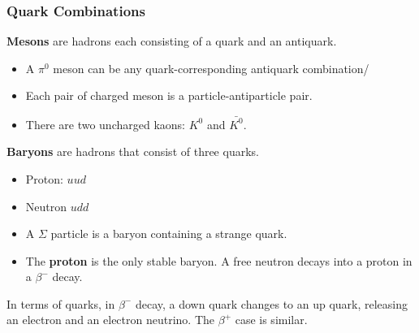 \subsubsection*{Quark Combinations}

\textbf{Mesons} are hadrons each consisting of a quark and an antiquark.
\begin{itemize}
    \item A $\pi^0$ meson can be any quark-corresponding antiquark combination/
    \item Each pair of charged meson is a particle-antiparticle pair.
    \item There are two uncharged kaons: $K^0$ and $\bar{K^0}$.
\end{itemize}

\textbf{Baryons} are hadrons that consist of three quarks. 
\begin{itemize}
    \item Proton: $uud$
    \item Neutron $udd$
    \item A $\Sigma$ particle is a baryon containing a strange quark.
    \item The \textbf{proton} is the only stable baryon. A free neutron decays into a proton in a $\beta^-$ decay.
\end{itemize}

In terms of quarks, in $\beta^-$ decay, a down quark changes to an up quark, releasing an electron and an electron neutrino. The $\beta^+$ case is similar.
